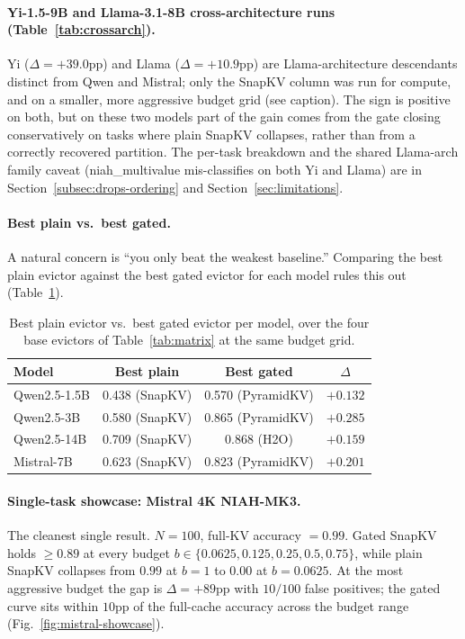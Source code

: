 \documentclass{article} %
\begin{document}
\paragraph{Yi-1.5-9B and Llama-3.1-8B cross-architecture runs
(Table~\ref{tab:crossarch}).} Yi
($\Delta = +39.0$pp) and Llama ($\Delta = +10.9$pp) are
Llama-architecture descendants distinct from Qwen and Mistral; only
the SnapKV column was run for compute, and on a smaller, more
aggressive budget grid (see caption). The sign is positive on both,
but on these two models part of the gain comes from the gate closing
conservatively on tasks where plain SnapKV collapses, rather than from
a correctly recovered partition. The per-task breakdown and the
shared Llama-arch family caveat (niah\_multivalue mis-classifies on
both Yi and Llama) are in Section~\ref{subsec:drops-ordering} and
Section~\ref{sec:limitations}.

\paragraph{Best plain vs.\ best gated.} A natural concern is ``you
only beat the weakest baseline.'' Comparing the best plain evictor against the
best gated evictor for each model rules this out (Table~\ref{tab:bestplain}).

\begin{table}[t]
\centering
\caption{Best plain evictor vs.\ best gated evictor per model, over
the four base evictors of Table~\ref{tab:matrix} at the same budget grid.}
\label{tab:bestplain}
\begin{tabular}{lccc}
\toprule
Model & Best plain & Best gated & $\Delta$ \\
\midrule
Qwen2.5-1.5B & 0.438 (SnapKV)    & 0.570 (PyramidKV) & $+0.132$ \\
Qwen2.5-3B   & 0.580 (SnapKV)    & 0.865 (PyramidKV) & $+0.285$ \\
Qwen2.5-14B  & 0.709 (SnapKV)    & 0.868 (H2O)       & $+0.159$ \\
Mistral-7B    & 0.623 (SnapKV)    & 0.823 (PyramidKV) & $+0.201$ \\
\bottomrule
\end{tabular}
\end{table}

\paragraph{Single-task showcase: Mistral 4K NIAH-MK3.} The cleanest single
result. $N = 100$, full-KV accuracy $= 0.99$. Gated SnapKV holds
$\geq 0.89$ at every budget $b \in \{0.0625, 0.125, 0.25, 0.5, 0.75\}$,
while plain SnapKV collapses from $0.99$ at $b = 1$ to $0.00$ at $b =
0.0625$. At the most aggressive budget the gap is $\Delta = +89$pp with
$10/100$ false positives; the gated curve sits within $10$pp of the
full-cache accuracy across the budget range (Fig.~\ref{fig:mistral-showcase}).
\end{document}
